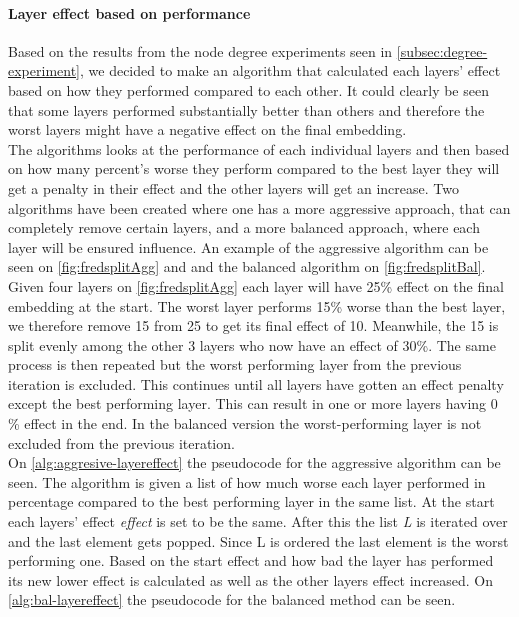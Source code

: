 \paragraph{Layer effect based on performance} \label{fredsplit}
Based on the results from the node degree experiments seen in \autoref{subsec:degree-experiment}, we decided to make an algorithm that calculated each layers' effect based on how they performed compared to each other.
It could clearly be seen that some layers performed substantially better than others and therefore the worst layers might have a negative effect on the final embedding.
\\
The algorithms looks at the performance of each individual layers and then based on how many percent's worse they perform compared to the best layer they will get a penalty in their effect and the other layers will get an increase.
Two algorithms have been created where one has a more aggressive approach, that can completely remove certain layers, and a more balanced approach, where each layer will be ensured influence.
An example of the aggressive algorithm can be seen on \autoref{fig:fredsplitAgg} and and the balanced algorithm on \autoref{fig:fredsplitBal}.
Given four layers on \autoref{fig:fredsplitAgg} each layer will have 25\% effect on the final embedding at the start.
The worst layer performs 15\% worse than the best layer, we therefore remove 15 from 25 to get its final effect of 10.
Meanwhile, the 15 is split evenly among the other 3 layers who now have an effect of 30\%.
The same process is then repeated but the worst performing layer from the previous iteration is excluded.
This continues until all layers have gotten an effect penalty except the best performing layer.
This can result in one or more layers having 0 \% effect in the end.
In the balanced version the worst-performing layer is not excluded from the previous iteration.
\\
On \autoref{alg:aggresive-layereffect} the pseudocode for the aggressive algorithm can be seen.
The algorithm is given a list of how much worse each layer performed in percentage compared to the best performing layer in the same list.
At the start each layers' effect \textit{effect} is set to be the same.
After this the list \textit{L} is iterated over and the last element gets popped.
Since L is ordered the last element is the worst performing one.
Based on the start effect and how bad the layer has performed its new lower effect is calculated as well as the other layers effect increased.
On \autoref{alg:bal-layereffect} the pseudocode for the balanced method can be seen.
